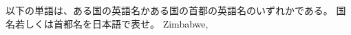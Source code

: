 \documentclass{jarticle}
\begin{document}
\vspace*{\fill}
\begin{center}
以下の単語は、ある国の英語名かある国の首都の英語名のいずれかである。
国名若しくは首都名を日本語で表せ。
Zimbabwe, 
\end{center}
\vspace*{\fill}
\end{document}
